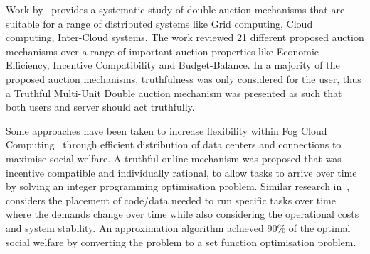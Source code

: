 Work by~\cite{KUMAR2017234} provides a systematic study of double auction mechanisms that are suitable for a range
of distributed systems like Grid computing, Cloud computing, Inter-Cloud systems. The work reviewed 21 different
proposed auction mechanisms over a range of important auction properties like Economic Efficiency,
Incentive Compatibility and Budget-Balance. In a majority of the proposed auction mechanisms, truthfulness was only
considered for the user, thus a Truthful Multi-Unit Double auction mechanism was presented as such that both users and
server should act truthfully.

Some approaches have been taken to increase flexibility within Fog Cloud Computing~\citep{Bi2019} through efficient
distribution of data centers and connections to maximise social welfare. A truthful online mechanism was
proposed that was incentive compatible and individually rational, to allow tasks to arrive over time by solving an
integer programming optimisation problem. Similar research in~\cite{vaji_infocom}, considers the placement of code/data
needed to run specific tasks over time where the demands change over time while also considering the operational costs
and system stability. An approximation algorithm achieved 90\% of the optimal social welfare by converting the problem
to a set function optimisation problem.